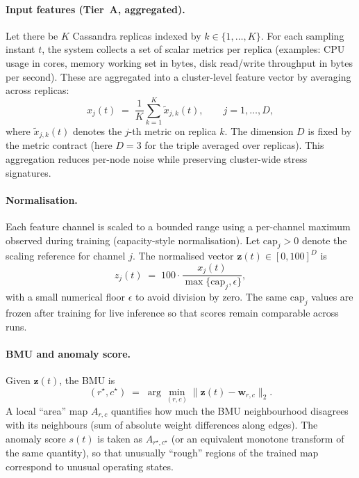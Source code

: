 \documentclass[11pt,a4paper]{article}
\begin{document}
\paragraph{Input features (Tier~A, aggregated).}
Let there be $K$ Cassandra replicas indexed by $k \in \{1,\ldots,K\}$. For each sampling instant $t$, the system collects a set of scalar metrics per replica (examples: CPU usage in cores, memory working set in bytes, disk read/write throughput in bytes per second). These are aggregated into a cluster-level feature vector by averaging across replicas:
\begin{equation}
  x_j(t) \;=\; \frac{1}{K}\sum_{k=1}^{K} \tilde{x}_{j,k}(t),
  \qquad j=1,\ldots,D,
\end{equation}
where $\tilde{x}_{j,k}(t)$ denotes the $j$-th metric on replica $k$. The dimension $D$ is fixed by the metric contract (here $D{=}3$ for the triple averaged over replicas). This aggregation reduces per-node noise while preserving cluster-wide stress signatures.

\paragraph{Normalisation.}
Each feature channel is scaled to a bounded range using a per-channel maximum observed during training (capacity-style normalisation). Let $\mathrm{cap}_j > 0$ denote the scaling reference for channel $j$. The normalised vector $\mathbf{z}(t) \in [0,100]^D$ is
\begin{equation}
  z_j(t) \;=\; 100 \cdot \frac{x_j(t)}{\max\{\mathrm{cap}_j,\epsilon\}},
\end{equation}
with a small numerical floor $\epsilon$ to avoid division by zero. The same $\mathrm{cap}_j$ values are frozen after training for live inference so that scores remain comparable across runs.

\paragraph{BMU and anomaly score.}
Given $\mathbf{z}(t)$, the BMU is
\begin{equation}
  (r^\star,c^\star) \;=\; \arg\min_{(r,c)} \|\mathbf{z}(t)-\mathbf{w}_{r,c}\|_2 .
\end{equation}
A local ``area'' map $A_{r,c}$ quantifies how much the BMU neighbourhood disagrees with its neighbours (sum of absolute weight differences along edges). The anomaly score $s(t)$ is taken as $A_{r^\star,c^\star}$ (or an equivalent monotone transform of the same quantity), so that unusually ``rough'' regions of the trained map correspond to unusual operating states.
\end{document}

